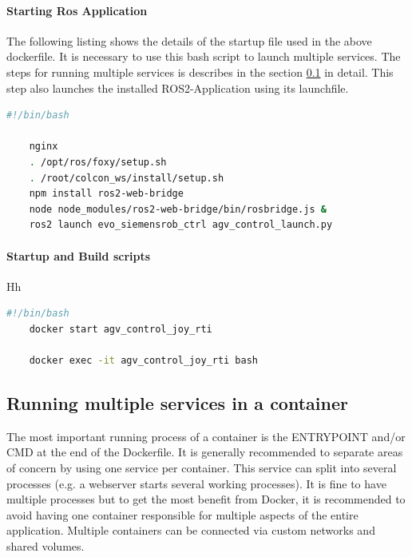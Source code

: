 \paragraph{Starting Ros Application} 
The following listing shows the details of the startup file used in the above dockerfile. It is necessary to use this bash script to launch multiple services. The steps for running multiple services is describes in the section \ref*{Implementation:Docker:Multiple Services} in detail.
This step also launches the installed ROS2-Application using its launchfile.
\begin{lstlisting}[language=bash,
	caption={dockerfilestartup.sh}, 
	label={code:DockerTestumgebung}]
	#!/bin/bash

	nginx
	. /opt/ros/foxy/setup.sh
	. /root/colcon_ws/install/setup.sh
	npm install ros2-web-bridge
	node node_modules/ros2-web-bridge/bin/rosbridge.js &
	ros2 launch evo_siemensrob_ctrl agv_control_launch.py 
\end{lstlisting}

\paragraph{Startup and Build scripts} Hh


\begin{lstlisting}[language=bash,
	caption={runlifecycle.sh}, 
	label={code:DockerTestumgebung}]
	#!/bin/bash
	docker start agv_control_joy_rti

	docker exec -it agv_control_joy_rti bash 
\end{lstlisting}

\subsection{Running multiple services in a container}
\label{Implementation:Docker:Multiple Services}
The most important running process of a container is the ENTRYPOINT and/or CMD at the end of the Dockerfile. It is generally recommended to separate areas of concern by using one service per container. This service can split into several processes (e.g. a webserver starts several working processes). It is fine to have multiple processes but to get the most benefit from Docker, it is recommended to avoid having one container responsible for multiple aspects of the entire application. Multiple containers can be connected via custom networks and shared volumes.

